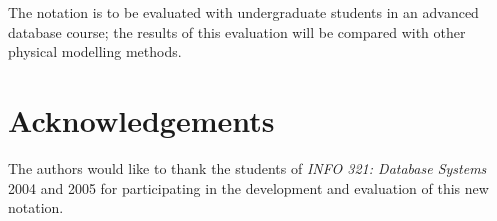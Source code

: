 \documentclass{CRPITStyle}
\begin{document}
The notation is to be evaluated with undergraduate students in an
advanced database course; the results of this evaluation will be
compared with other physical modelling methods.


\section*{Acknowledgements}

The authors would like to thank the students of \emph{INFO 321: Database
Systems} 2004 and 2005 for participating in the development and evaluation
of this new notation.





\end{document}
